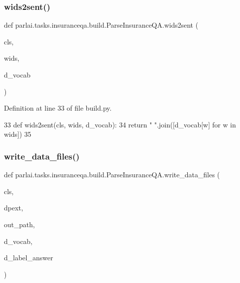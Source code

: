 \subsubsection{\texorpdfstring{wids2sent()}{wids2sent()}}
{\footnotesize\ttfamily def parlai.\+tasks.\+insuranceqa.\+build.\+Parse\+Insurance\+Q\+A.\+wids2sent (\begin{DoxyParamCaption}\item[{}]{cls,  }\item[{}]{wids,  }\item[{}]{d\+\_\+vocab }\end{DoxyParamCaption})}



Definition at line 33 of file build.\+py.


\begin{DoxyCode}
33     \textcolor{keyword}{def }wids2sent(cls, wids, d\_vocab):
34         \textcolor{keywordflow}{return} \textcolor{stringliteral}{" "}.join([d\_vocab[w] \textcolor{keywordflow}{for} w \textcolor{keywordflow}{in} wids])
35 
\end{DoxyCode}
\mbox{\label{classparlai_1_1tasks_1_1insuranceqa_1_1build_1_1ParseInsuranceQA_abd3ae5efba9775554d68e911fd36c840}} 
\subsubsection{\texorpdfstring{write\+\_\+data\+\_\+files()}{write\_data\_files()}}
{\footnotesize\ttfamily def parlai.\+tasks.\+insuranceqa.\+build.\+Parse\+Insurance\+Q\+A.\+write\+\_\+data\+\_\+files (\begin{DoxyParamCaption}\item[{}]{cls,  }\item[{}]{dpext,  }\item[{}]{out\+\_\+path,  }\item[{}]{d\+\_\+vocab,  }\item[{}]{d\+\_\+label\+\_\+answer }\end{DoxyParamCaption})}



